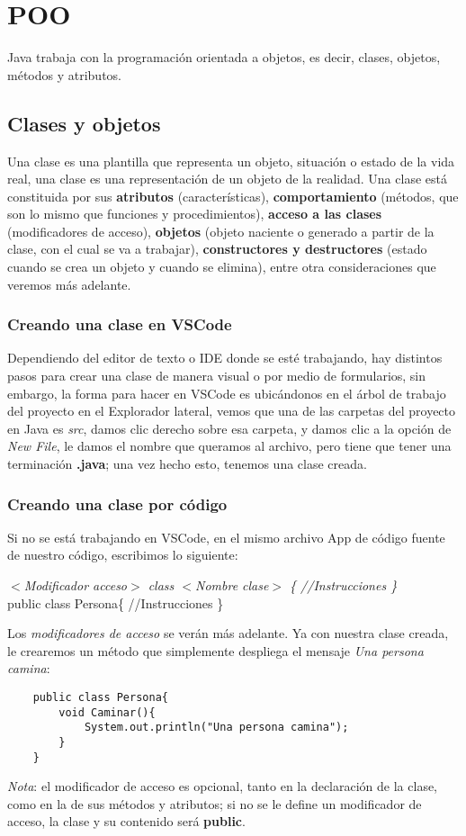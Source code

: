 \section{POO}
Java trabaja con la programación orientada a objetos, es decir, clases, objetos, métodos y atributos.
\subsection{Clases y objetos}
Una clase es una plantilla que representa un objeto, situación o estado de la vida real, una clase es una representación de un objeto de la realidad. Una clase está constituida por sus \textbf{atributos} (características), \textbf{comportamiento} (métodos, que son lo mismo que funciones y procedimientos), \textbf{acceso a las clases} (modificadores de acceso), \textbf{objetos} (objeto naciente o generado a partir de la clase, con el cual se va a trabajar), \textbf{constructores y destructores} (estado cuando se crea un objeto y cuando se elimina), entre otra consideraciones que veremos más adelante.

\subsubsection{Creando una clase en VSCode}
Dependiendo del editor de texto o IDE donde se esté trabajando, hay distintos pasos para crear una clase de manera visual o por medio de formularios, sin embargo, la forma para hacer en VSCode es ubicándonos en el árbol de trabajo del proyecto en el Explorador lateral, vemos que una de las carpetas del proyecto en Java es \textit{src}, damos clic derecho sobre esa carpeta, y damos clic a la opción de \textit{New File}, le damos el nombre que queramos al archivo, pero tiene que tener una terminación \textbf{.java}; una vez hecho esto, tenemos una clase creada.

\subsubsection{Creando una clase por código}
Si no se está trabajando en VSCode, en el mismo archivo App de código fuente de nuestro código, escribimos lo siguiente:\begin{center}\textit{$<$Modificador acceso$>$ class $<$Nombre clase$>$ \{ //Instrucciones \}}\\public class Persona\{ //Instrucciones \}\end{center}
Los \textit{modificadores de acceso} se verán más adelante. Ya con nuestra clase creada, le crearemos un método que simplemente despliega el mensaje \textit{Una persona camina}:
\begin{lstlisting}
    public class Persona{
        void Caminar(){
            System.out.println("Una persona camina");
        }
    }
\end{lstlisting}
\textit{Nota}: el modificador de acceso es opcional, tanto en la declaración de la clase, como en la de sus métodos y atributos; si no se le define un modificador de acceso, la clase y su contenido será \textbf{public}.

